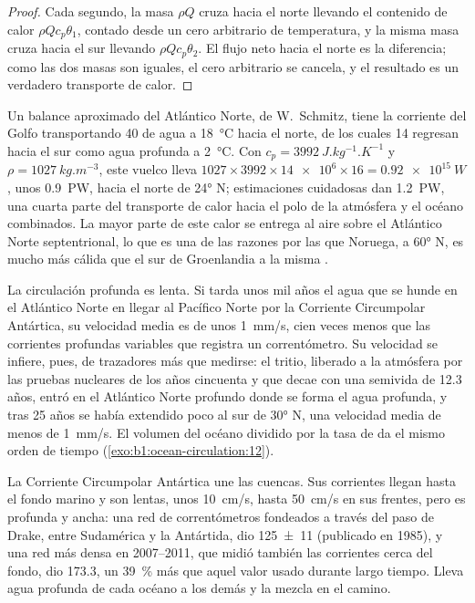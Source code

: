 \begin{proof}
Cada segundo, la masa $\rho Q$ cruza hacia el norte llevando el contenido de calor $\rho Q
c_p\theta_1$, contado desde un cero arbitrario de temperatura, y la misma masa cruza hacia el sur llevando $\rho Q c_p\theta_2$. El flujo neto hacia el norte es la diferencia; como las dos masas son iguales, el cero arbitrario se cancela, y el resultado es un verdadero transporte de calor.
\end{proof}

Un balance aproximado del Atlántico Norte, de W.~Schmitz, tiene la corriente del Golfo transportando \qty{40}{\sverdrup} de agua a \qty{18}{\celsius} hacia el norte, de los cuales \qty{14}{\sverdrup} regresan hacia el sur como agua profunda a \qty{2}{\celsius}. Con $c_p =
\qty{3992}{J.kg^{-1}.K^{-1}}$ y $\rho = \qty{1027}{kg.m^{-3}}$, este vuelco lleva $1027 \times 3992 \times \num{14e6} \times 16 = \qty{0.92e15}{W}$, unos \qty{0.9}{PW}, hacia el norte de \ang{24} N; estimaciones cuidadosas dan \qty{1.2}{PW}, una cuarta parte del transporte de calor hacia el polo de la atmósfera y el océano combinados. La mayor parte de este calor se entrega al aire sobre el Atlántico Norte septentrional, lo que es una de las razones por las que Noruega, a \ang{60} N, es mucho más cálida que el sur de Groenlandia a la misma .

La circulación profunda es lenta. Si tarda unos mil años el agua que se hunde en el Atlántico Norte en llegar al Pacífico Norte por la Corriente Circumpolar Antártica, su velocidad media es de unos \qty{1}{mm/s}, cien veces menos que las corrientes profundas variables que registra un correntómetro. Su velocidad se infiere, pues, de trazadores más que medirse: el tritio, liberado a la atmósfera por las pruebas nucleares de los años cincuenta y que decae con una semivida de 12.3 años, entró en el Atlántico Norte profundo donde se forma el agua profunda, y tras 25 años se había extendido poco al sur de \ang{30} N, una velocidad media de menos de \qty{1}{mm/s}. El volumen del océano dividido por la tasa de  da el mismo orden de tiempo (\cref{exo:b1:ocean-circulation:12}).

La Corriente Circumpolar Antártica une las cuencas. Sus corrientes llegan hasta el fondo marino y son lentas, unos \qty{10}{cm/s}, hasta \qty{50}{cm/s} en sus frentes, pero es profunda y ancha: una red de correntómetros fondeados a través del paso de Drake, entre Sudamérica y la Antártida, dio \qty[uncertainty-mode=separate]{125 \pm 11}{\sverdrup} (publicado en 1985), y una red más densa en 2007--2011, que midió también las corrientes cerca del fondo, dio \qty{173.3}{\sverdrup}, un \qty{39}{\percent} más que aquel valor usado durante largo tiempo. Lleva agua profunda de cada océano a los demás y la mezcla en el camino.

